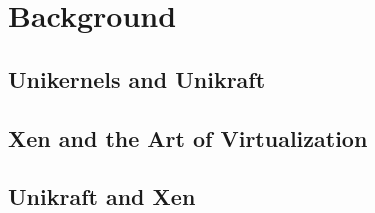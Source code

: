 \chapter{Background}
\label{chapter:background}

\section{Unikernels and Unikraft}
\label{sec:unikernels-unikraft}

\section{Xen and the Art of Virtualization}
\label{sec:xen}

\section{Unikraft and Xen}
\label{sec:unikraft-xen}









